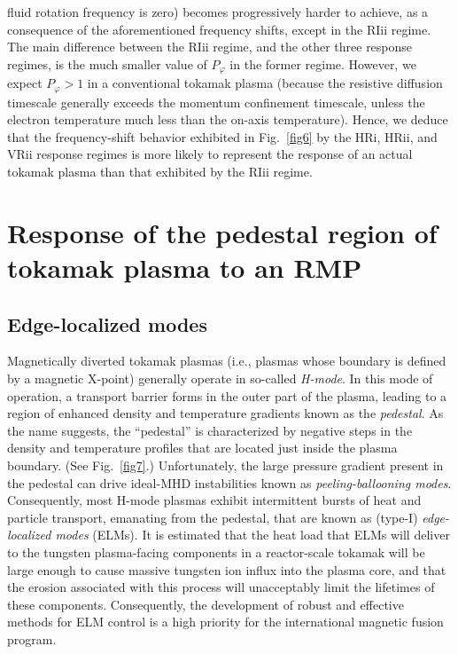 \documentclass[12pt,prb,aps]{revtex4-1}
\providecommand{\DIFadd}[1]{{\protect\color{blue}\uwave{#1}}} %
\providecommand{\DIFaddbegin}{} %
\providecommand{\DIFaddend}{} %
\begin{document}
fluid  rotation frequency is zero)   becomes progressively harder to achieve, 
as a consequence of the aforementioned frequency shifts, except in the RIii regime. The main difference between the RIii regime, and the other three response regimes, is the much smaller value of $P_\varphi$ in the former regime. However, we expect $P_\varphi>1$ in a conventional tokamak
plasma (because the resistive diffusion timescale generally exceeds the momentum confinement timescale, unless the electron temperature \DIFaddbegin \DIFadd{is }\DIFaddend much less than the on-axis temperature). Hence, we deduce that the frequency-shift behavior exhibited  in Fig.~\ref{fig6} by the
HRi, HRii, and VRii response regimes is more likely to represent the response of an actual tokamak plasma than that exhibited by the RIii regime. 

\section{Response of  the pedestal region of tokamak plasma to an RMP}\label{sect4}
\subsection{Edge-localized modes}
Magnetically diverted tokamak plasmas (i.e., plasmas whose boundary is defined by a magnetic X-point) generally operate in so-called {\em H-mode}.\cite{hmode} In this  mode of operation, a transport barrier forms in the outer part of 
the plasma, leading to a region of enhanced density and temperature gradients known as the {\em pedestal}. As the name suggests, the ``pedestal''
is characterized  by negative steps in the density and temperature profiles that are located just inside the plasma boundary. (See Fig.~\ref{fig7}.) 
Unfortunately, the large pressure gradient present in the pedestal can drive ideal-MHD instabilities known as {\em peeling-ballooning modes}.\cite{pb} Consequently, most H-mode plasmas exhibit intermittent bursts of heat and particle transport, emanating from the pedestal, that are known as (type-I)
{\em edge-localized modes}  (ELMs).\cite{elm}  It is estimated that the heat load that ELMs will
deliver to the tungsten plasma-facing components in a reactor-scale
tokamak will be large enough to cause massive tungsten ion influx
into the plasma core, and that the erosion associated with this process will
unacceptably limit the lifetimes of these components.\cite{elm1} Consequently,
the development of robust and effective methods for ELM control is a
high priority for the international magnetic fusion program.
\end{document}
